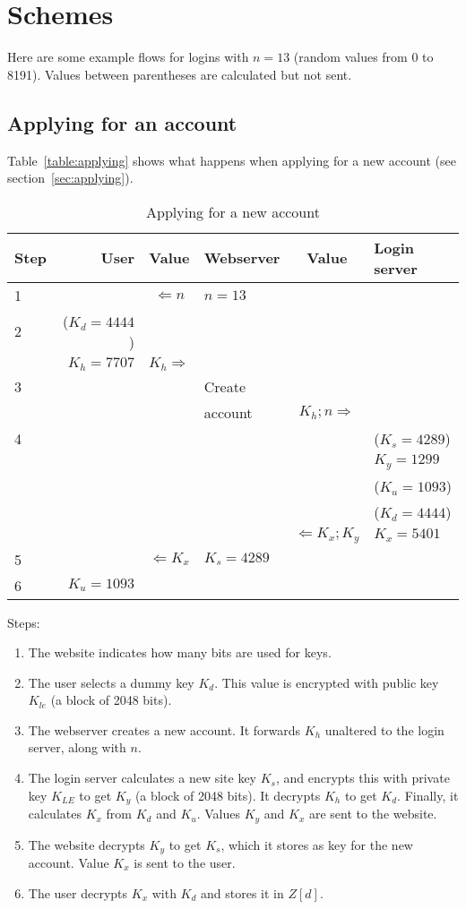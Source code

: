 \section{Schemes}
\label{sec:schemes}
Here are some example flows for logins with $n=13$
(random values from 0 to 8191).
Values between parentheses are calculated but not sent.
\subsection{Applying for an account}
\label{scheme:new_account}
Table~\vref{table:applying} shows what happens when applying for a new account
(see section~\vref{sec:applying}).
\begin{table}[hb]
\label{table:applying}
\caption{Applying for a new account}
\begin{tabular}{|l|r|c|l|c|l|}
\hline
Step & User & Value & Webserver & Value & Login server\\
\hline
1 & & $\Longleftarrow n$ & $n=13$ & & \\
\hline
2 & ($K_d=4444$) & & & & \\
  & $K_h=7707$ & $K_h \Longrightarrow$ & & & \\
\hline
3 & & & Create  & & \\
  & & & account & $K_h;n \Longrightarrow$ & \\
\hline
4 & & & & & ($K_s=4289$) \\
  & & & & & $K_y=1299$ \\
  & & & & & ($K_u=1093$) \\
  & & & & & ($K_d=4444$) \\
  & & & & $\Longleftarrow K_x;K_y$ & $K_x=5401$ \\
\hline
5 & & $\Longleftarrow K_x$ & $K_s=4289$ & & \\
\hline
6 & $K_u=1093$ & & & & \\
\hline
\end{tabular}
\end{table}
\par
Steps:
\begin{enumerate}
\item	The website indicates how many bits are used for keys.
\item	The user selects a dummy key $K_d$.
		This value is encrypted with public key $K_{le}$
		(a block of 2048 bits).
\item	The webserver creates a new account.
		It forwards $K_h$ unaltered to the login server,
		along with $n$.
\item	The login server calculates a new site key $K_s$,
		and encrypts this with private key $K_{LE}$ to get $K_y$
		(a block of 2048 bits).
		It decrypts $K_h$ to get $K_d$.
		Finally, it calculates $K_x$ from $K_d$ and $K_u$.
		Values $K_y$ and $K_x$ are sent to the website.
\item	The website decrypts $K_y$ to get $K_s$,
		which it stores as key for the new account.
		Value $K_x$ is sent to the user.
\item	The user decrypts $K_x$ with $K_d$ and stores it in $Z[d]$.
\end{enumerate}
